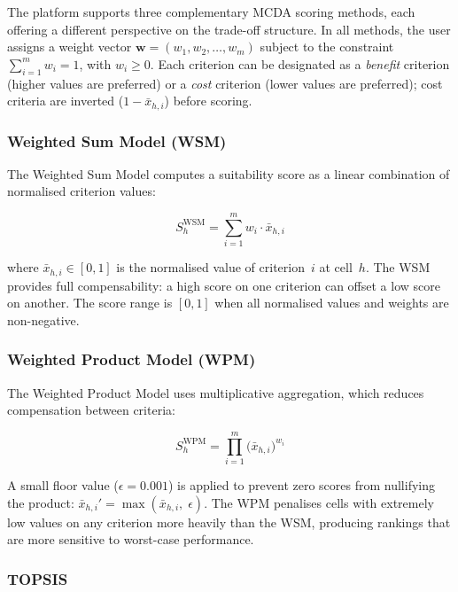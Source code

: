 The platform supports three complementary MCDA scoring methods, each offering a different perspective on the trade-off structure. In all methods, the user assigns a weight vector $\mathbf{w} = (w_1, w_2, \ldots, w_m)$ subject to the constraint $\sum_{i=1}^{m} w_i = 1$, with $w_i \geq 0$. Each criterion can be designated as a \emph{benefit} criterion (higher values are preferred) or a \emph{cost} criterion (lower values are preferred); cost criteria are inverted ($1 - \bar{x}_{h,i}$) before scoring.

\subsubsection{Weighted Sum Model (WSM)}

The Weighted Sum Model computes a suitability score as a linear combination of normalised criterion values:

\begin{equation}
\label{eq:wsm}
S_h^{\text{WSM}} = \sum_{i=1}^{m} w_i \cdot \bar{x}_{h,i}
\end{equation}

\noindent where $\bar{x}_{h,i} \in [0,1]$ is the normalised value of criterion~$i$ at cell~$h$. The WSM provides full compensability: a high score on one criterion can offset a low score on another. The score range is $[0, 1]$ when all normalised values and weights are non-negative.

\subsubsection{Weighted Product Model (WPM)}

The Weighted Product Model uses multiplicative aggregation, which reduces compensation between criteria:

\begin{equation}
\label{eq:wpm}
S_h^{\text{WPM}} = \prod_{i=1}^{m} \bigl(\bar{x}_{h,i}\bigr)^{w_i}
\end{equation}

\noindent A small floor value ($\epsilon = 0.001$) is applied to prevent zero scores from nullifying the product: $\bar{x}_{h,i}' = \max(\bar{x}_{h,i},\; \epsilon)$. The WPM penalises cells with extremely low values on any criterion more heavily than the WSM, producing rankings that are more sensitive to worst-case performance.

\subsubsection{TOPSIS}

